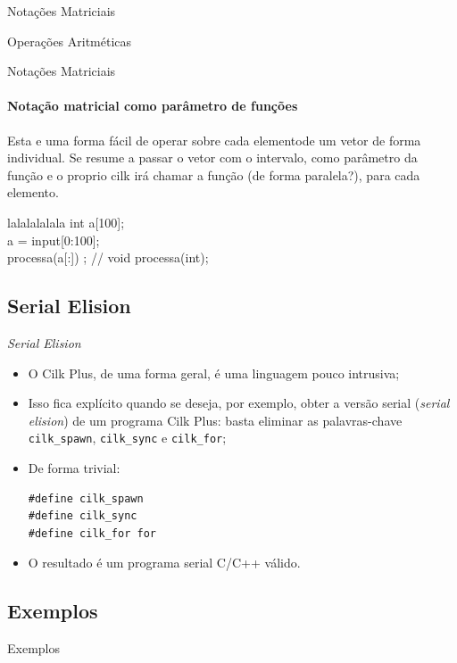 \documentclass{beamer}
\begin{document}
{\begin{frame}[fragile]{Notações Matriciais}
\begin{scriptsize}
\begin{block}{Operações Aritméticas}
\end{block}
\end{scriptsize}

\end{frame}
}
\begin{frame}[fragile]{Notações Matriciais}
\framesubtitle{Notação matricial como parâmetro de funções}
   Esta e uma forma fácil de operar sobre cada elementode um vetor de forma
   individual. Se resume a passar o vetor com o intervalo, como parâmetro da função
   e o proprio cilk irá chamar a função (de forma paralela?), para cada elemento.
\begin{scriptsize}
\begin{block}{lalalalalala} 
    int a[100];        \\
    a = input[0:100];\\
   processa(a[:]) ;  // void processa(int);\\
\end{block}
\end{scriptsize}
\end{frame}

\subsection{Serial Elision}
\begin{frame}[fragile]{\textit{Serial Elision}}
\begin{itemize}
    \item O Cilk Plus, de uma forma geral, é uma linguagem pouco intrusiva;
    \item Isso fica explícito quando se deseja, por exemplo, obter a versão
    serial (\textit{serial elision}) de um programa Cilk Plus: basta eliminar as
    palavras-chave \texttt{cilk\_spawn}, \texttt{cilk\_sync} e
    \texttt{cilk\_for};
    \item De forma trivial:
\begin{lstlisting}
#define cilk_spawn
#define cilk_sync
#define cilk_for for
\end{lstlisting}
    \item O resultado é um programa serial C/C++ válido.
\end{itemize}
\end{frame}

\subsection{Exemplos}
\begin{frame}{Exemplos}
\end{frame}
\end{document}
